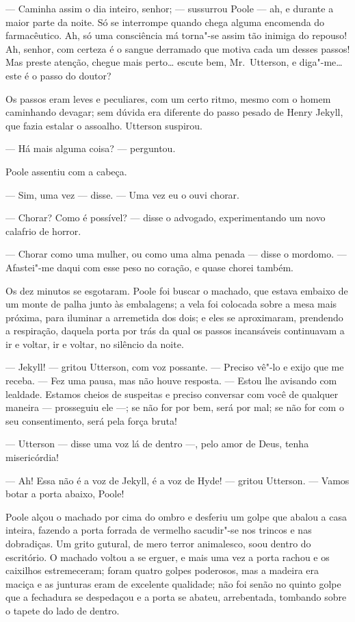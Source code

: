 --- Caminha assim o dia inteiro, senhor; --- sussurrou Poole --- ah, e
durante a maior parte da noite.  Só se interrompe quando chega alguma
encomenda do farmacêutico.  Ah, só uma consciência má torna"-se assim
tão inimiga do repouso! Ah, senhor, com certeza é o sangue derramado
que motiva cada um desses passos!  Mas preste atenção, chegue mais
perto\ldots{} escute bem, Mr.~Utterson, e diga"-me\ldots{} este é o passo do
doutor?

Os passos eram leves e peculiares, com um certo ritmo, mesmo com o homem
caminhando devagar; sem dúvida era diferente do passo pesado de Henry
Jekyll, que fazia estalar o assoalho.  Utterson suspirou.

--- Há mais alguma coisa? --- perguntou.

Poole assentiu com a cabeça.

--- Sim, uma vez --- disse. --- Uma vez eu o ouvi chorar.

--- Chorar?  Como é possível? --- disse o advogado, experimentando um novo
calafrio de horror.

--- Chorar como uma mulher, ou como uma alma penada --- disse o mordomo. ---
Afastei"-me daqui com esse peso no coração, e quase chorei também.

Os dez minutos se esgotaram.  Poole foi buscar o machado, que estava
embaixo de um monte de palha junto às embalagens; a vela foi colocada
sobre a mesa mais próxima, para iluminar a arremetida dos dois; e eles
se aproximaram, prendendo a respiração, daquela porta por trás da qual
os passos incansáveis continuavam a ir e voltar, ir e voltar, no
silêncio da noite.

--- Jekyll! --- gritou Utterson, com voz possante. --- Preciso vê"-lo e exijo
que me receba. --- Fez uma pausa, mas não houve resposta. --- Estou lhe
avisando com lealdade.  Estamos cheios de suspeitas e preciso conversar
com você de qualquer maneira --- prosseguiu ele ---; se não for por bem,
será por mal; se não for com o seu consentimento, será pela força
bruta!

--- Utterson --- disse uma voz lá de dentro ---, pelo amor de Deus, tenha
misericórdia!

--- Ah!  Essa não é a voz de Jekyll, é a voz de Hyde! --- gritou Utterson.
--- Vamos botar a porta abaixo, Poole!

Poole alçou o machado por cima do ombro e desferiu um golpe que abalou a
casa inteira, fazendo a porta forrada de vermelho sacudir"-se nos
trincos e nas dobradiças.  Um grito gutural, de mero terror animalesco,
soou dentro do escritório.  O machado voltou a se erguer, e mais uma
vez a porta rachou e os caixilhos estremeceram; foram quatro golpes
poderosos, mas a madeira era maciça e as junturas eram de excelente
qualidade; não foi senão no quinto golpe que a fechadura se despedaçou
e a porta se abateu, arrebentada, tombando sobre o tapete do lado de
dentro. 

